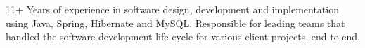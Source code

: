 

\begin{cvparagraph}

    11+ Years of experience in software design, development and implementation using Java, Spring, Hibernate and MySQL. Responsible for leading teams that handled the software development life cycle for various client projects, end to end.
\end{cvparagraph}
